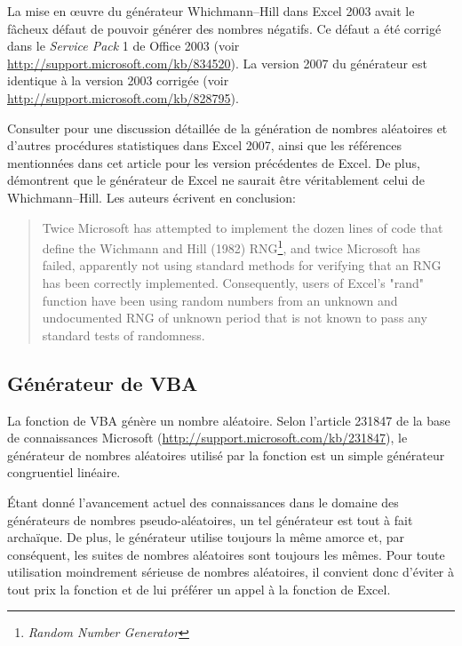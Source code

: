 La mise en {\oe}uvre du générateur Whichmann--Hill dans Excel 2003
avait le fâcheux défaut de pouvoir générer des nombres négatifs. Ce
défaut a été corrigé dans le \emph{Service Pack} 1 de Office 2003
(voir \url{http://support.microsoft.com/kb/834520}). La version 2007
du générateur est identique à la version 2003 corrigée (voir
\url{http://support.microsoft.com/kb/828795}).

Consulter \cite{McCullough:Excel2007:2008} pour une discussion
détaillée de la génération de nombres aléatoires et d'autres
procédures statistiques dans Excel 2007, ainsi que les références
mentionnées dans cet article pour les version précédentes de Excel. De
plus, \citet{McCullough:MENTWH:2008} démontrent que le générateur de
Excel ne saurait être véritablement celui de Whichmann--Hill. Les
auteurs écrivent en conclusion:

\begin{quote}
  Twice Microsoft has attempted to implement the dozen lines of code
  that define the Wichmann and Hill (1982) RNG\footnote{%
    \emph{Random Number Generator}}, %
  and twice Microsoft has failed, apparently not using standard
  methods for verifying that an RNG has been correctly implemented.
  Consequently, users of Excel's "rand" function have been using
  random numbers from an unknown and undocumented RNG of unknown
  period that is not known to pass any standard tests of randomness.
\end{quote}



\subsection{Générateur de VBA}

\begin{sloppypar}
  La fonction  de VBA génère un nombre aléatoire. Selon
  l'article 231847 de la base de connaissances Microsoft
  (\url{http://support.microsoft.com/kb/231847}),
  le générateur de nombres aléatoires utilisé par la fonction
   est un simple générateur congruentiel linéaire.
\end{sloppypar}

Étant donné l'avancement actuel des connaissances dans le domaine des
générateurs de nombres pseudo-aléatoires, un tel générateur est tout à
fait archaïque. De plus, le générateur utilise toujours la même amorce
et, par conséquent, les suites de nombres aléatoires sont toujours les
mêmes. Pour toute utilisation moindrement sérieuse de nombres
aléatoires, il convient donc d'éviter à tout prix la fonction
 et de lui préférer un appel à la fonction 
de Excel.


